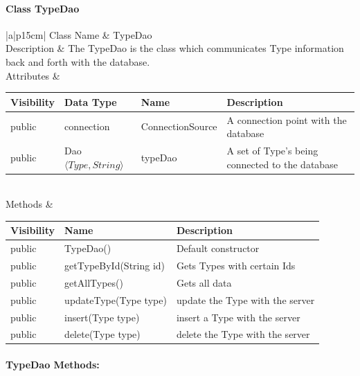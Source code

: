 \documentclass[12pt]{article}
\begin{document}
\paragraph{Class TypeDao}
\begin{table}[H]
	\begin{tabular}{|a|p{15cm}|}
		\hline
		{Class Name} & {TypeDao} \\
		\hline
		Description & The TypeDao is the class which communicates Type information back and forth with the database.\\
		\hline
		Attributes & 
		\begin{tabular}{| p{1.8cm} | p{3.25cm} | p{5.4cm} | p{3.0cm} |}
			\hline
			\rowcolor{lightgray}
			Visibility & Data Type & Name & Description \\
			\hline
			\rowcolor{white}
			public & connection & ConnectionSource & A connection point with the database \\
			\hline
			public & Dao$\langle Type, String \rangle$  & typeDao  & A set of Type's being connected to the database \\	
			\hline	
		\end{tabular} \\
		\hline
		Methods & 		 
		\begin{tabular}{| p{2cm} | p{5cm} | p{6.9cm} |}
			\hline
			\rowcolor{gray}
			{Visibility} &{Name} & {Description} \\
			\hline
			\rowcolor{white}			
			public &  TypeDao() & Default constructor\\
			\hline
			public &  getTypeById(String id)&Gets Types with certain Ids\\
			\hline
			public &  getAllTypes() & Gets all data\\
			\hline
			public &  updateType(Type type) & update the Type with the server\\
			\hline
			public &  insert(Type type) & insert a Type with the server\\
			\hline
			public &  delete(Type type) & delete the Type with the server\\ 
			\hline
			
		\end{tabular}								 
	\end{tabular}
\end{table}
\paragraph{TypeDao Methods:}
\end{document}
